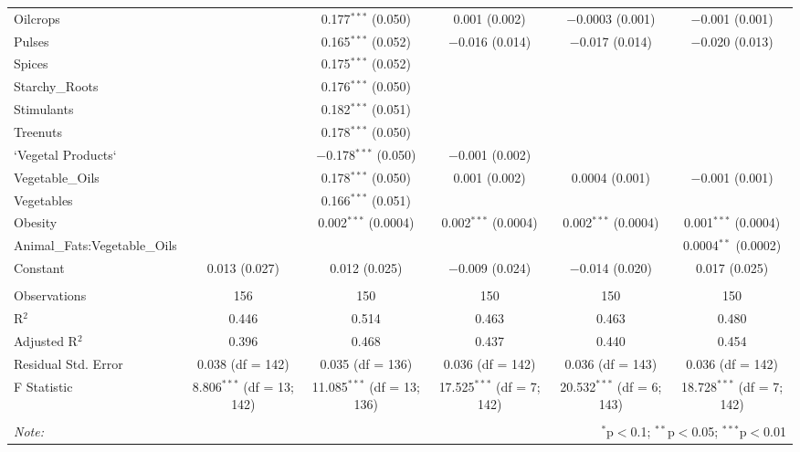 \documentclass[
]{article}
\begin{document}
\begin{table}[!htbp]
\begin{tabular}{@{\extracolsep{-15pt}}lccccc}
  Oilcrops &  & 0.177$^{***}$ (0.050) & 0.001 (0.002) & $-$0.0003 (0.001) & $-$0.001 (0.001) \\ 
  Pulses &  & 0.165$^{***}$ (0.052) & $-$0.016 (0.014) & $-$0.017 (0.014) & $-$0.020 (0.013) \\ 
  Spices &  & 0.175$^{***}$ (0.052) &  &  &  \\ 
  Starchy\_Roots &  & 0.176$^{***}$ (0.050) &  &  &  \\ 
  Stimulants &  & 0.182$^{***}$ (0.051) &  &  &  \\ 
  Treenuts &  & 0.178$^{***}$ (0.050) &  &  &  \\ 
  `Vegetal Products` &  & $-$0.178$^{***}$ (0.050) & $-$0.001 (0.002) &  &  \\ 
  Vegetable\_Oils &  & 0.178$^{***}$ (0.050) & 0.001 (0.002) & 0.0004 (0.001) & $-$0.001 (0.001) \\ 
  Vegetables &  & 0.166$^{***}$ (0.051) &  &  &  \\ 
  Obesity &  & 0.002$^{***}$ (0.0004) & 0.002$^{***}$ (0.0004) & 0.002$^{***}$ (0.0004) & 0.001$^{***}$ (0.0004) \\ 
  Animal\_Fats:Vegetable\_Oils &  &  &  &  & 0.0004$^{**}$ (0.0002) \\ 
  Constant & 0.013 (0.027) & 0.012 (0.025) & $-$0.009 (0.024) & $-$0.014 (0.020) & 0.017 (0.025) \\ 
 \hline \\[-1.8ex] 
Observations & 156 & 150 & 150 & 150 & 150 \\ 
R$^{2}$ & 0.446 & 0.514 & 0.463 & 0.463 & 0.480 \\ 
Adjusted R$^{2}$ & 0.396 & 0.468 & 0.437 & 0.440 & 0.454 \\ 
Residual Std. Error & 0.038 (df = 142) & 0.035 (df = 136) & 0.036 (df = 142) & 0.036 (df = 143) & 0.036 (df = 142) \\ 
F Statistic & 8.806$^{***}$ (df = 13; 142) & 11.085$^{***}$ (df = 13; 136) & 17.525$^{***}$ (df = 7; 142) & 20.532$^{***}$ (df = 6; 143) & 18.728$^{***}$ (df = 7; 142) \\ 
\hline 
\hline \\[-1.8ex] 
\textit{Note:}  & \multicolumn{5}{r}{$^{*}$p$<$0.1; $^{**}$p$<$0.05; $^{***}$p$<$0.01} \\ 
\end{tabular} 
\end{table}
\end{document}
